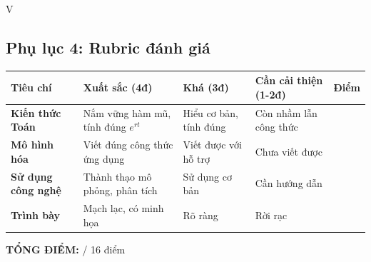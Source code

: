 \documentclass[12pt,a4paper]{article}
\begin{document}
\begin{competitionsection}{V}
\subsection*{Phụ lục 4: Rubric đánh giá}
\begin{tabularx}{\textwidth}{|>{\raggedright\arraybackslash}p{2.5cm}|X|X|X|c|}
\hline
\rowcolor{TableHeader}
\sffamily\bfseries Tiêu chí & \sffamily\bfseries Xuất sắc (4đ) & \sffamily\bfseries Khá (3đ) & \sffamily\bfseries Cần cải thiện (1-2đ) & \sffamily\bfseries Điểm \\
\hline
\textbf{Kiến thức Toán} & Nắm vững hàm mũ, tính đúng $e^{rt}$ & Hiểu cơ bản, tính đúng & Còn nhầm lẫn công thức & \underline{\hspace{1cm}} \\
\hline
\textbf{Mô hình hóa} & Viết đúng công thức ứng dụng & Viết được với hỗ trợ & Chưa viết được & \underline{\hspace{1cm}} \\
\hline
\textbf{Sử dụng công nghệ} & Thành thạo mô phỏng, phân tích & Sử dụng cơ bản & Cần hướng dẫn & \underline{\hspace{1cm}} \\
\hline
\textbf{Trình bày} & Mạch lạc, có minh họa & Rõ ràng & Rời rạc & \underline{\hspace{1cm}} \\
\hline
\end{tabularx}
\vspace{0.5cm}
\noindent\textbf{TỔNG ĐIỂM:} \underline{\hspace{2cm}} / 16 điểm
\end{competitionsection}
\end{document}
